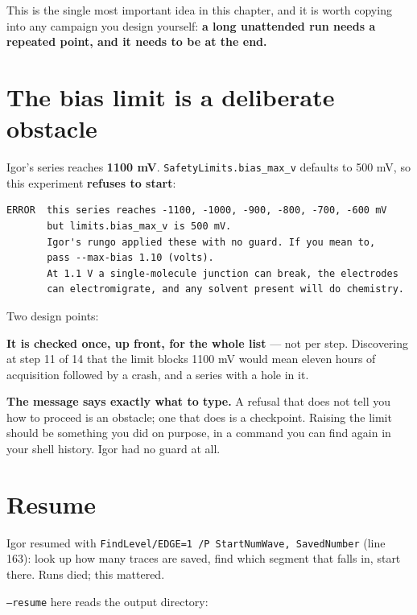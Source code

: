 This is the single most important idea in this chapter, and it is worth copying into any campaign you design yourself: \textbf{a long unattended run needs a repeated point, and it needs to be at the end.}

\section{The bias limit is a deliberate obstacle}

Igor's series reaches \textbf{1100 mV}. \texttt{Safety\discretionary{}{}{}Limits.\discretionary{}{}{}bias\_\discretionary{}{}{}max\_\discretionary{}{}{}v} defaults to 500 mV, so this experiment \textbf{refuses to start}:

\begin{lstlisting}[style=out]
ERROR  this series reaches -1100, -1000, -900, -800, -700, -600 mV
       but limits.bias_max_v is 500 mV.
       Igor's rungo applied these with no guard. If you mean to,
       pass --max-bias 1.10 (volts).
       At 1.1 V a single-molecule junction can break, the electrodes
       can electromigrate, and any solvent present will do chemistry.
\end{lstlisting}

Two design points:

\textbf{It is checked once, up front, for the whole list} --- not per step. Discovering at step 11 of 14 that the limit blocks 1100 mV would mean eleven hours of acquisition followed by a crash, and a series with a hole in it.

\textbf{The message says exactly what to type.} A refusal that does not tell you how to proceed is an obstacle; one that does is a checkpoint. Raising the limit should be something you did on purpose, in a command you can find again in your shell history. Igor had no guard at all.

\section{Resume}

Igor resumed with \texttt{Find\discretionary{}{}{}Level/\discretionary{}{}{}EDGE=1 /\discretionary{}{}{}P Start\discretionary{}{}{}Num\discretionary{}{}{}Wave,\discretionary{}{}{} Saved\discretionary{}{}{}Number} (line 163): look up how many traces are saved, find which segment that falls in, start there. Runs died; this mattered.

\texttt{--resume} here reads the output directory:

